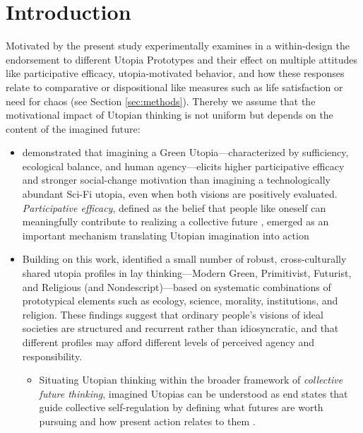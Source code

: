 \documentclass[jou,floatsintext]{apa7}
\begin{document}
\section{Introduction}

Motivated by \cite{fernandoProfilesIdealSociety2023} the present study experimentally examines in a within-design the endorsement to different Utopia Prototypes and their effect on multiple attitudes like participative efficacy, utopia-motivated behavior, and how these responses relate to comparative or dispositional like measures such as life satisfaction or need for chaos (see Section \ref{sec:methods}). Thereby we assume that the motivational impact of Utopian thinking \parencite[e.g.,][]{fernandoFunctionsUtopiaHow2018} is not uniform but depends on the content of the imagined future:

\begin{itemize}
    \item \textcite{fernandoGreensSpaceInvaders2020} demonstrated that imagining a Green Utopia---characterized by sufficiency, ecological balance, and human agency---elicits higher participative efficacy and stronger social-change motivation than imagining a technologically abundant Sci-Fi utopia, even when both visions are positively evaluated. \textit{Participative efficacy}, defined as the belief that people like oneself can meaningfully contribute to realizing a collective future \parencite{vanzomerenBelievingMakingDifference2013}, emerged as an important mechanism translating Utopian imagination into action \parencite[see][]{fernandoMoreIdyllSpeculation2019, fernandoGreensSpaceInvaders2020}
    \item Building on this work, \textcite{fernandoProfilesIdealSociety2023} identified a small number of robust, cross-culturally shared utopia profiles in lay thinking---Modern Green, Primitivist, Futurist, and Religious (and Nondescript)---based on systematic combinations of prototypical elements such as ecology, science, morality, institutions, and religion. These findings suggest that ordinary people’s visions of ideal societies are structured and recurrent rather than idiosyncratic, and that different profiles may afford different levels of perceived agency and responsibility.
    \begin{itemize}
        \item[$\rightarrow$] Situating Utopian thinking within the broader framework of \textit{collective future thinking}, imagined Utopias can be understood as end states that guide collective self-regulation by defining what futures are worth pursuing and how present action relates to them \parencite{kashimaCollectiveFutureThinking2025}.  

\end{itemize}
\end{itemize}
\end{document}

